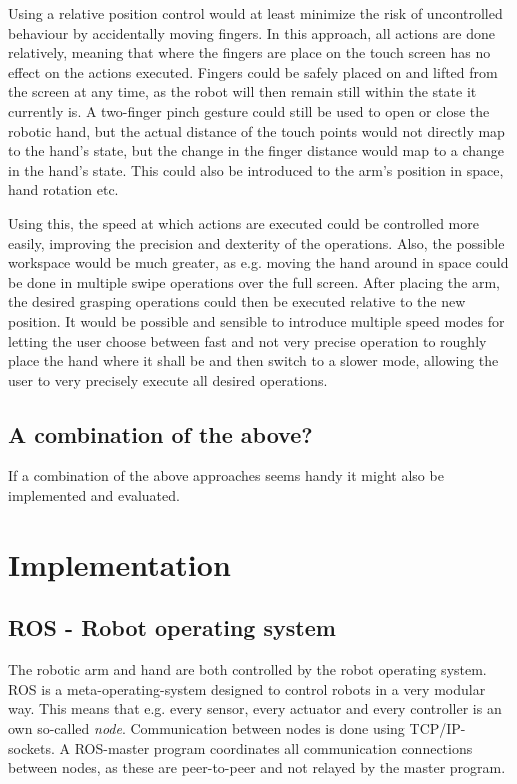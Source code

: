 \documentclass[a4paper]{article}
\begin{document}
Using a relative position control would at least minimize the risk of uncontrolled behaviour by accidentally moving fingers. In this approach, all actions are done relatively, meaning that where the fingers are place on the touch screen has no effect on the actions executed. Fingers could be safely placed on and lifted from the screen at any time, as the robot will then remain still within the state it currently is. A two-finger pinch gesture could still be used to open or close the robotic hand, but the actual distance of the touch points would not directly map to the hand's state, but the change in the finger distance would map to a change in the hand's state. This could also be introduced to the arm's position in space, hand rotation etc.

Using this, the speed at which actions are executed could be controlled more easily, improving the precision and dexterity of the operations. Also, the possible workspace would be much greater, as e.g. moving the hand around in space could be done in multiple swipe operations over the full screen. After placing the arm, the desired grasping operations could then be executed relative to the new position. It would be possible and sensible to introduce multiple speed modes for letting the user choose between fast and not very precise operation to roughly place the hand where it shall be and then switch to a slower mode, allowing the user to very precisely execute all desired operations.

\subsection{A combination of the above?}

If a combination of the above approaches seems handy it might also be implemented and evaluated. 

\section{Implementation}
\label{sec:impl}
\subsection{ROS - Robot operating system}

The robotic arm and hand are both controlled by the robot operating system. ROS is a meta-operating-system designed to control robots in a very modular way. This means that e.g. every sensor, every actuator and every controller is an own so-called \textit{node}. Communication between nodes is done using TCP/IP-sockets. A ROS-master program coordinates all communication connections between nodes, as these are peer-to-peer and not relayed by the master program.
\end{document}
